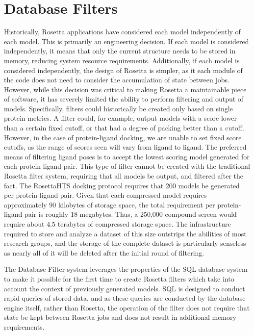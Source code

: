 \section{Database Filters}

Historically, Rosetta applications have considered each model independently of each model.
This is primarily an engineering decision.
If each model is considered independently, it means that only the current structure needs to be stored in memory, reducing system resource requirements. 
Additionally, if each model is considered independently, the design of Rosetta is simpler, as it each module of the code does not need to consider the accumulation of state between jobs.
However, while this decision was critical to making Rosetta a maintainable piece of software, it has severely limited the ability to perform filtering and output of models. 
Specifically, filters could historically be created only based on single protein metrics.
A filter could, for example, output models with a score lower than a certain fixed cutoff, or that had a degree of packing better than a cutoff.
However, in the case of protein-ligand docking, we are unable to set fixed score cutoffs, as the range of scores seen will vary from ligand to ligand.
The preferred means of filtering ligand poses is to accept the lowest scoring model generated for each protein-ligand pair.
This type of filter cannot be created with the traditional Rosetta filter system, requiring that all models be output, and filtered after the fact.
The RosettaHTS docking protocol requires that 200 models be generated per protein-ligand pair. 
Given that each compressed model requires approximately 90 kilobytes of storage space, the total requirement per protein-ligand pair is roughly 18 megabytes.
Thus, a 250,000 compound screen would require about 4.5 terabytes of compressed storage space. 
The infrastructure required to store and analyze a dataset of this size outstrips the abilities of most research groups, and the storage of the complete dataset is particularly senseless as nearly all of it will be deleted after the initial round of filtering. 

The Database Filter system leverages the properties of the SQL database system to make it possible for the first time to create Rosetta filters which take into account the context of previously generated models.
SQL is designed to conduct rapid queries of stored data, and as these queries are conducted by the database engine itself, rather than Rosetta, the operation of the filter does not require that state be kept between Rosetta jobs and does not result in additional memory requirements.

